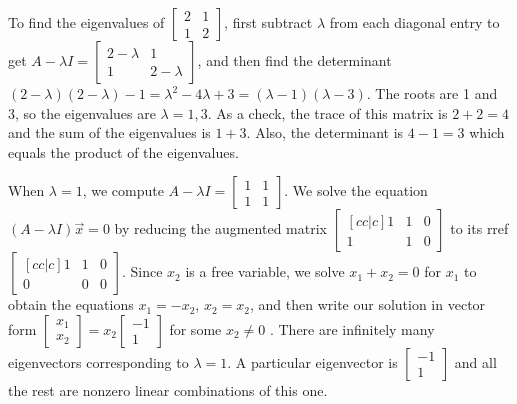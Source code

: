 \begin{example} \label{ex eigen1}
To find the eigenvalues of {$\begin{bmatrix} 2&1\\1&2\end{bmatrix} $}, first subtract $\lambda$ from each diagonal entry to get {$A-\lambda I=\begin{bmatrix} 2-\lambda&1\\1&2-\lambda\end{bmatrix} $}, and then find the determinant {$(2-\lambda)(2-\lambda)-1 = \lambda^2-4\lambda+3=(\lambda-1)(\lambda-3)$}. The roots are 1 and 3, so the eigenvalues are {$\lambda=1,3$}. As a check, the trace of this matrix is $2+2=4$ and the sum of the eigenvalues is $1+3$. Also, the determinant is $4-1=3$ which equals the product of the eigenvalues.  

When {$\lambda=1$}, we compute {$A-\lambda I =\begin{bmatrix} 1&1\\1&1\end{bmatrix} $}. We solve the equation  {$(A-\lambda I )\vec x=0$} by reducing the augmented matrix $\begin{bmatrix}[cc|c] 1&1&0\\1&1&0\end{bmatrix} $ to its rref $\begin{bmatrix}[cc|c] 1&1&0\\0&0&0\end{bmatrix} $. Since $x_2$ is a free variable, we solve $x_1+x_2=0$ for $x_1$ to obtain the equations $x_1=-x_2$, $x_2=x_2$, and then write our solution in vector form 
$\begin{bmatrix} x_1\\x_2\end{bmatrix}= x_2\begin{bmatrix} -1\\1\end{bmatrix}$
 for some {$x_2\neq 0$} . There are infinitely many eigenvectors corresponding to $\lambda=1$. A particular eigenvector is  $\begin{bmatrix} -1\\1\end{bmatrix} $ and all the rest are nonzero linear combinations of this one. 


\end{example}
